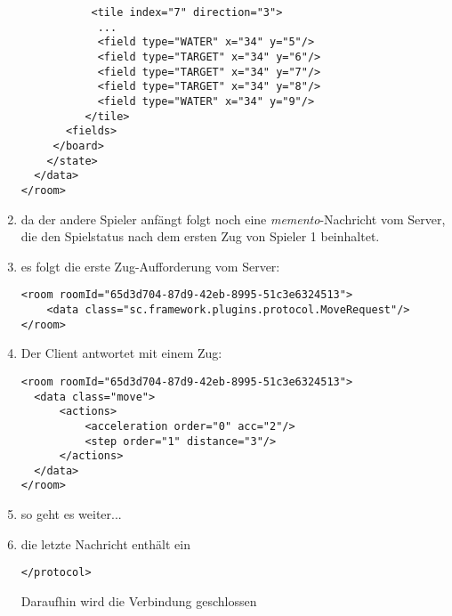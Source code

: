\documentclass[12pt,a4paper, ngerman, oneside]{scrartcl}
\begin{document}
\begin{enumerate}
\begin{verbatim}
           <tile index="7" direction="3">
            ...
            <field type="WATER" x="34" y="5"/>
            <field type="TARGET" x="34" y="6"/>
            <field type="TARGET" x="34" y="7"/>
            <field type="TARGET" x="34" y="8"/>
            <field type="WATER" x="34" y="9"/>
          </tile>
       <fields>
     </board>
    </state>
  </data>
</room>
\end{verbatim}
\item da der andere Spieler anfängt folgt noch eine \textit{memento}-Nachricht vom Server, die den Spielstatus nach dem ersten Zug von Spieler 1 beinhaltet.
\item es folgt die erste Zug-Aufforderung vom Server: \begin{verbatim}
<room roomId="65d3d704-87d9-42eb-8995-51c3e6324513">
    <data class="sc.framework.plugins.protocol.MoveRequest"/>
</room>
\end{verbatim}
\item Der Client antwortet mit einem Zug: \begin{verbatim}
<room roomId="65d3d704-87d9-42eb-8995-51c3e6324513">
  <data class="move">
      <actions>
    	  <acceleration order="0" acc="2"/>
    	  <step order="1" distance="3"/>
      </actions>
  </data>
</room>
\end{verbatim}
\item so geht es weiter...
\item die letzte Nachricht enthält ein \begin{verbatim}
</protocol>
\end{verbatim}
Daraufhin wird die Verbindung geschlossen
\end{enumerate}
\end{document}
